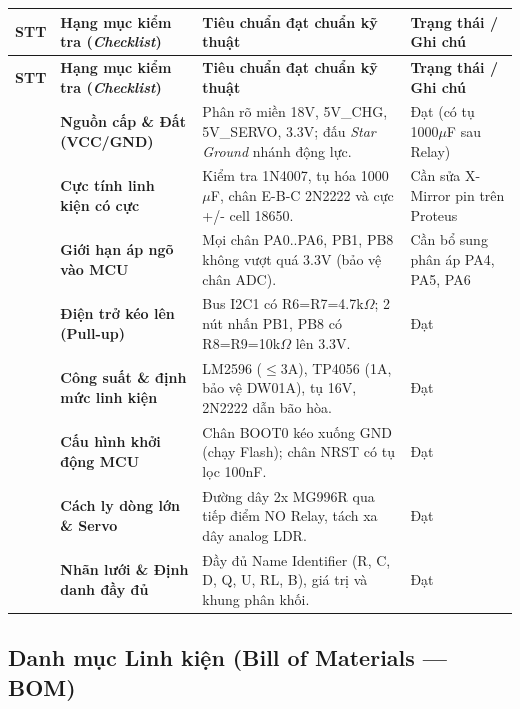 \documentclass[12pt,a4paper]{report}
\begin{document}
{
\small
\setlength{\LTleft}{0pt}\setlength{\LTright}{0pt}
\begin{longtable}{>{\raggedright\arraybackslash}p{}>{\raggedright\arraybackslash}p{}>{\raggedright\arraybackslash}p{}>{\raggedright\arraybackslash}p{}}
\toprule
\textbf{STT} & \textbf{Hạng mục kiểm tra (}\textbf{\textit{Checklist}}\textbf{)} & \textbf{Tiêu chuẩn đạt chuẩn kỹ thuật} & \textbf{Trạng thái / Ghi chú} \\
\midrule
\endfirsthead
\toprule
\textbf{STT} & \textbf{Hạng mục kiểm tra (}\textbf{\textit{Checklist}}\textbf{)} & \textbf{Tiêu chuẩn đạt chuẩn kỹ thuật} & \textbf{Trạng thái / Ghi chú} \\
\midrule
\endhead
\bottomrule
\endfoot
\bottomrule
\endlastfoot
1 & \textbf{Nguồn cấp \& Đất (VCC/GND)} & Phân rõ miền 18V, 5V\_CHG, 5V\_SERVO, 3.3V; đấu \textit{Star Ground} nhánh động lực. & Đạt (có tụ 1000\ensuremath{\mu}F sau Relay) \\
2 & \textbf{Cực tính linh kiện có cực} & Kiểm tra 1N4007, tụ hóa 1000\ensuremath{\mu}F, chân E-B-C 2N2222 và cực +/- cell 18650. & Cần sửa X-Mirror pin trên Proteus \\
3 & \textbf{Giới hạn áp ngõ vào MCU} & Mọi chân PA0..PA6, PB1, PB8 không vượt quá 3.3V (bảo vệ chân ADC). & Cần bổ sung phân áp PA4, PA5, PA6 \\
4 & \textbf{Điện trở kéo lên (Pull-up)} & Bus I2C1 có R6=R7=4.7k\ensuremath{\Omega}; 2 nút nhấn PB1, PB8 có R8=R9=10k\ensuremath{\Omega} lên 3.3V. & Đạt \\
5 & \textbf{Công suất \& định mức linh kiện} & LM2596 (\ensuremath{\le}3A), TP4056 (1A, bảo vệ DW01A), tụ 16V, 2N2222 dẫn bão hòa. & Đạt \\
6 & \textbf{Cấu hình khởi động MCU} & Chân BOOT0 kéo xuống GND (chạy Flash); chân NRST có tụ lọc 100nF. & Đạt \\
7 & \textbf{Cách ly dòng lớn \& Servo} & Đường dây 2x MG996R qua tiếp điểm NO Relay, tách xa dây analog LDR. & Đạt \\
8 & \textbf{Nhãn lưới \& Định danh đầy đủ} & Đầy đủ Name Identifier (R, C, D, Q, U, RL, B), giá trị và khung phân khối. & Đạt \\
\end{longtable}
}

\subsection{Danh mục Linh kiện (Bill of Materials --- BOM)}
\end{document}
